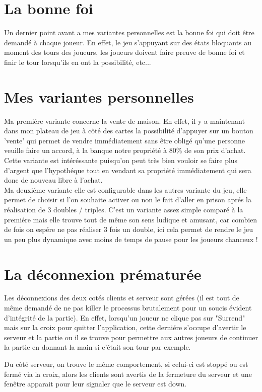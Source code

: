 \documentclass[12pt, openany]{report}
\begin{document}
    \section{La bonne foi}
Un dernier point avant a mes variantes personnelles est la bonne foi qui doit être demandé à chaque joueur. En effet, le jeu s'appuyant sur des états bloquants au moment des tours des joueurs, les joueurs doivent faire preuve de bonne foi et finir le tour lorsqu'ils en ont la possibilité, etc...

    \section{Mes variantes personnelles}
        Ma premiére variante concerne la vente de maison. En effet, il y a maintenant dans mon plateau de jeu à côté des cartes la possibilité d'appuyer sur un bouton 'vente' qui permet de vendre immédiatement sans être obligé qu'une personne veuille faire un accord, à la banque notre propriété à 80\% de son prix d'achat. Cette variante est intéréssante puisqu'on peut très bien vouloir se faire plus d'argent que l'hypothéque tout en vendant sa propriété immédiatement qui sera donc de nouveau libre à l'achat.
\\
	Ma deuxiéme variante elle est configurable dans les autres variante du jeu, elle permet de choisir si l'on souhaite activer ou non le fait d'aller en prison aprés la réalisation de 3 doubles / triples. C'est un variante assez simple comparé à la premiére mais elle trouve tout de même son sens ludique et amusant, car combien de fois on espére ne pas réaliser 3 fois un double, ici cela permet de rendre le jeu un peu plus dynamique avec moins de temps de pause pour les joueurs chanceux !

    \section{La déconnexion prématurée}
Les déconnexions des deux cotés clients et serveur sont gérées (il est tout de même demandé de ne pas killer le processus brutalement pour un soucis évident d'intégrité de la partie). En effet, lorsqu'un joueur ne clique pas sur "Surrend" mais sur la croix pour quitter l'application, cette derniére s'occupe d'avertir le serveur et la partie ou il se trouve pour permettre aux autres joueurs de continuer la partie en donnant la main si c'était son tour par exemple.

Du côté serveur, on trouve le même comportement, si celui-ci est stoppé ou est fermé via la croix, alors les clients sont avertis de la fermeture du serveur et une fenêtre apparait pour leur signaler que le serveur est down.
\end{document}

